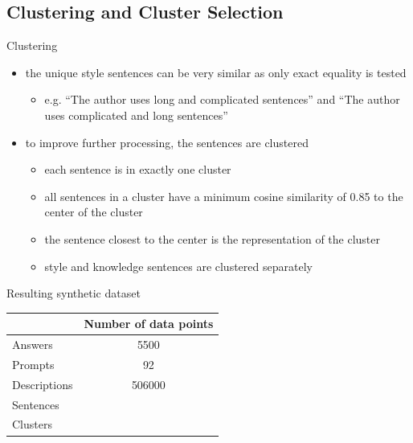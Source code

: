 \documentclass[]{beamer}
\begin{document}
\subsection{Clustering and Cluster Selection}
\begin{frame}{Clustering}
  \begin{itemize}
    \item the unique style sentences can be very similar as only exact equality is tested
          \begin{itemize}
            \item e.g. \enquote{The author uses long and complicated sentences} and \enquote{The author uses complicated and long sentences}
          \end{itemize}
    \item to improve further processing, the sentences are clustered
          \pause
          \begin{itemize}
            \item each sentence is in exactly one cluster
            \item all sentences in a cluster have a minimum cosine similarity of \num{0.85} to the center of the cluster
            \item the sentence closest to the center is the representation of the cluster
            \item style and knowledge sentences are clustered separately
          \end{itemize}
  \end{itemize}
\end{frame}

\begin{frame}{Resulting synthetic dataset}
  \begin{tabular}{lS}
    \toprule
                 & {Number of data points} \\ \midrule
    Answers      & 5500                    \\
    Prompts      & 92                      \\
    Descriptions & 506000                  \\
    Sentences    &          \\
    Clusters     &          \\ \bottomrule
  \end{tabular}
\end{frame}
\end{document}
